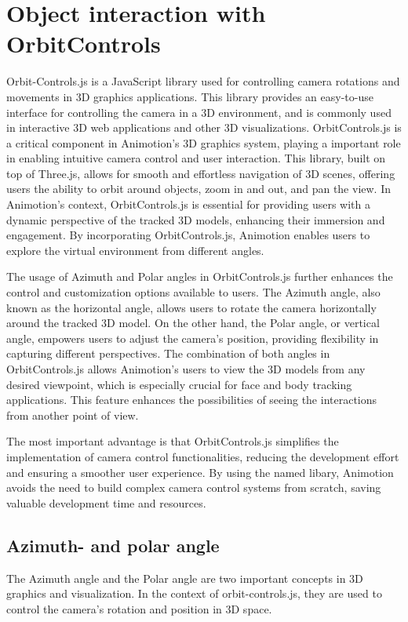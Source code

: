 \section{Object interaction with OrbitControls}
\author{Romeo Bhuiyan}
Orbit-Controls.js is a JavaScript library used for controlling camera rotations 
and movements in 3D graphics applications. This library provides an easy-to-use 
interface for controlling the camera in a 3D environment, and is commonly used in 
interactive 3D web applications and other 3D visualizations.
OrbitControls.js is a critical component in Animotion's 3D graphics system, playing a important role in 
enabling intuitive camera control and user interaction. This library, built on top of Three.js, allows 
for smooth and effortless navigation of 3D scenes, offering users the ability to orbit around objects, zoom in and out, and pan the view.
In Animotion's context, OrbitControls.js is essential for providing users with a dynamic perspective of the tracked 3D models, 
enhancing their immersion and engagement. By incorporating OrbitControls.js, 
Animotion enables users to explore the virtual environment from different angles.

The usage of Azimuth and Polar angles in OrbitControls.js further enhances the control and customization options available to users.
The Azimuth angle, also known as the horizontal angle, allows users to rotate the camera horizontally around the tracked 3D 
model. On the other hand, the Polar angle, or vertical angle, empowers users to adjust the camera's position, 
providing flexibility in capturing different perspectives.
The combination of both angles in OrbitControls.js allows Animotion's users to view the 3D models from any desired viewpoint, 
which is especially crucial for face and body tracking applications. This feature enhances the possibilities of seeing the 
interactions from another point of view.

The most important advantage is that OrbitControls.js simplifies the implementation of camera control functionalities, 
reducing the development effort and ensuring a smoother user experience. By using the named libary, 
Animotion avoids the need to build complex camera control systems from scratch, saving valuable development time and resources.
\cite{orbitcontrols}

\subsection{Azimuth- and polar angle}
The Azimuth angle and the Polar angle are two important concepts in 3D graphics and visualization. 
In the context of orbit-controls.js, they are used to control the camera's rotation and position in 3D space.

